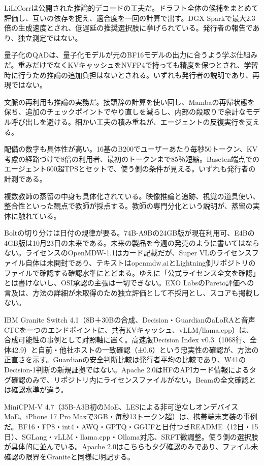 \documentclass[lualatex,a4paper,10pt]{jlreq}
\begin{document}
LiLiCorrは公開された推論的デコードの工夫だ。ドラフト全体の候補をまとめて評価し、互いの依存を捉え、適合度を一回の計算で出す。DGX Sparkで最大2.3倍の生成速度とされ、低遅延の推奨選択肢に挙げられている。発行者の報告であり、独立測定ではない。
\cite{B20,B21,B22}


量子化のQADは、量子化モデルが元のBF16モデルの出力に合うよう学ぶ仕組みだ。重みだけでなくKVキャッシュをNVFP4で持っても精度を保つとされ、学習時に行うため推論の追加負担はないとされる。いずれも発行者の説明であり、再現ではない。
\cite{B20,B21,B22}


文脈の再利用も推論の実務だ。接頭辞の計算を使い回し、Mambaの再帰状態を保ち、追加のチェックポイントでやり直しを減らし、内部の段取りで余計なモデル呼び出しを避ける。細かい工夫の積み重ねが、エージェントの反復実行を支える。
\cite{B20,B21,B22}


配備の数字も具体性が高い。16基のB200でユーザーあたり毎秒50トークン、KV考慮の経路づけで8倍の利用者、最初のトークンまで85％短縮。Baseten端点でのエージェント600超TPSとセットで、使う側の条件が見える。いずれも発行者の計測である。
\cite{B20,B21,B22}


複数教師の蒸留の中身も具体化されている。映像推論と追跡、視覚の道具使い、整合性といった観点で教師が採点する。教師の専門分化という説明が、蒸留の実体に触れている。
\cite{B20,B21,B22}


Boltの切り分けは日付の規律が要る。74B-A9Bの24GB版が現在利用可、E4Bの4GB版は10月23日の未来である。未来の製品を今週の発売のように書いてはならない。ライセンスのOpenMDW-1.1はカード記載だが、Super VLのライセンスファイル自体は未開封であり、テキストはopenmdw.aiとLightning側リポジトリのファイルで確認する確認水準にとどまる。ゆえに「公式ライセンス全文を確認」とは書けないし、OSI承認の主張は一切できない。EXO LabsのPareto評価への言及は、方法の詳細が未取得のため独立評価として不採用とし、スコアも掲載しない。
\cite{B20,B21,B22}


IBM Granite Switch 4.1（8B＋30Bの合成、Decision・GuardianのaLoRAと音声CTCを一つのエンドポイントに、共有KVキャッシュ、vLLM/llama.cpp）は、合成可能性の事例として対照軸に置く。高速版Decision Index v0.3（1068行、全体42.9）と自前・他社ホストの一致確認（±0.6）という忠実性の確認が、方法の正直さを示す。Guardianの安全判断比較は発行者平均の比較であり、W41のDecision-1判断の新規証拠ではない。Apache 2.0はHFのAPIカード情報によるタグ確認のみで、リポジトリ内にライセンスファイルがない。Beamの全文確認とは確認水準が違う。
\cite{B23,B24,B25}


MiniCPM-V 4.7（35B-A3B初のMoE、LESによる非可逆なしオンデバイスMoE、iPhone 17 Pro Maxで3GB・毎秒13トークン超）は、携帯端末実装の事例だ。BF16・FP8・int4・AWQ・GPTQ・GGUFと日付つきREADME（12日・15日）、SGLang・vLLM・llama.cpp・Ollama対応、SRFT微調整。使う側の選択肢が具体的に並んでいる。Apache 2.0はこちらもタグ確認のみであり、ファイル未確認の限界をGraniteと同様に明記する。
\cite{B26,B27}
\end{document}
